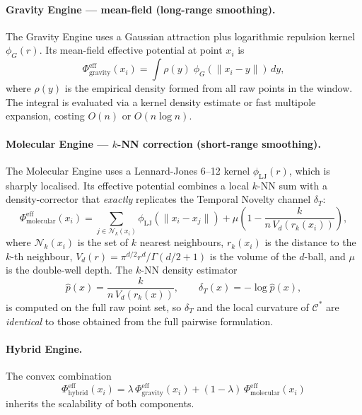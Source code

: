 \documentclass[11pt,a4paper]{article}
\newcommand{\Cman}{\mathcal{C}^*}
\newcommand{\norm}[1]{\|#1\|}
\begin{document}
\paragraph{Gravity Engine --- mean-field (long-range smoothing).}
The Gravity Engine uses a Gaussian attraction plus logarithmic repulsion
kernel $\phi_G(r)$.  Its mean-field effective potential at point $x_i$
is
\begin{equation}\label{eq:Phi_gravity_eff}
  \Phi_{\mathrm{gravity}}^{\mathrm{eff}}(x_i)
  = \int \rho(y)\;\phi_G(\norm{x_i - y})\,dy,
\end{equation}
where $\rho(y)$ is the empirical density formed from all raw points in
the window.  The integral is evaluated via a kernel density estimate or
fast multipole expansion, costing $O(n)$ or $O(n\log n)$.

\paragraph{Molecular Engine --- $k$-NN correction (short-range smoothing).}
The Molecular Engine uses a Lennard-Jones 6--12 kernel
$\phi_{\mathrm{LJ}}(r)$, which is sharply localised.  Its effective
potential combines a local $k$-NN sum with a density-corrector that
\emph{exactly} replicates the Temporal Novelty channel $\delta_T$:
\begin{equation}\label{eq:Phi_molecular_eff}
  \Phi_{\mathrm{molecular}}^{\mathrm{eff}}(x_i)
  = \sum_{j \in \mathcal{N}_k(x_i)}
      \phi_{\mathrm{LJ}}(\norm{x_i - x_j})
    + \mu\!\left(1 - \frac{k}{n\,V_d(r_k(x_i))}\right),
\end{equation}
where $\mathcal{N}_k(x_i)$ is the set of $k$ nearest neighbours,
$r_k(x_i)$ is the distance to the $k$-th neighbour,
$V_d(r) = \pi^{d/2}r^d / \Gamma(d/2+1)$ is the volume of the
$d$-ball, and $\mu$ is the double-well depth.  The $k$-NN density
estimator
\begin{equation}\label{eq:kNN_density}
  \hat{p}(x) = \frac{k}{n\,V_d(r_k(x))}, \qquad
  \delta_T(x) = -\log\hat{p}(x),
\end{equation}
is computed on the full raw point set, so $\delta_T$ and the local
curvature of $\Cman$ are \emph{identical} to those obtained from the
full pairwise formulation.

\paragraph{Hybrid Engine.}
The convex combination
\begin{equation}\label{eq:Phi_hybrid_eff}
  \Phi_{\mathrm{hybrid}}^{\mathrm{eff}}(x_i)
  = \lambda\,\Phi_{\mathrm{gravity}}^{\mathrm{eff}}(x_i)
    + (1-\lambda)\,\Phi_{\mathrm{molecular}}^{\mathrm{eff}}(x_i)
\end{equation}
inherits the scalability of both components.
\end{document}
